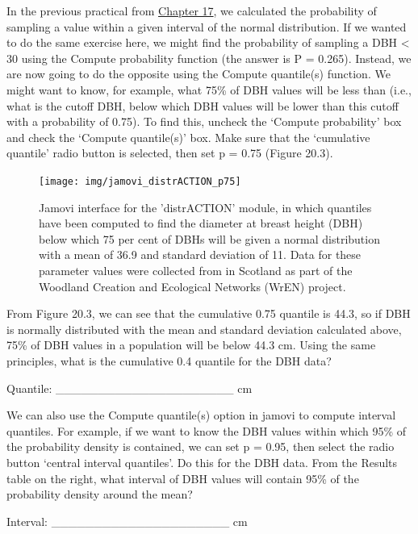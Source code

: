 \documentclass[
]{scrbook}
\begin{document}
In the previous practical from \protect\hyperlink{Chapter_17}{Chapter 17}, we calculated the probability of sampling a value within a given interval of the normal distribution.
If we wanted to do the same exercise here, we might find the probability of sampling a DBH \textless{} 30 using the Compute probability function (the answer is P = 0.265).
Instead, we are now going to do the opposite using the Compute quantile(s) function.
We might want to know, for example, what 75\% of DBH values will be less than (i.e., what is the cutoff DBH, below which DBH values will be lower than this cutoff with a probability of 0.75).
To find this, uncheck the `Compute probability' box and check the `Compute quantile(s)' box.
Make sure that the `cumulative quantile' radio button is selected, then set p = 0.75 (Figure 20.3).

\begin{figure}
\texttt{[image: img/jamovi\_distrACTION\_p75]} \caption{Jamovi interface for the 'distrACTION' module, in which quantiles have been computed to find the diameter at breast height (DBH) below which 75 per cent of DBHs will be given a normal distribution with a mean of 36.9 and standard deviation of 11. Data for these parameter values were collected from in Scotland as part of the Woodland Creation and Ecological Networks (WrEN) project.}\label{fig:unnamed-chunk-89}
\end{figure}

From Figure 20.3, we can see that the cumulative 0.75 quantile is 44.3, so if DBH is normally distributed with the mean and standard deviation calculated above, 75\% of DBH values in a population will be below 44.3 cm.
Using the same principles, what is the cumulative 0.4 quantile for the DBH data?

Quantile: \_\_\_\_\_\_\_\_\_\_\_\_\_\_\_\_\_\_\_\_\_ cm

We can also use the Compute quantile(s) option in jamovi to compute interval quantiles.
For example, if we want to know the DBH values within which 95\% of the probability density is contained, we can set p = 0.95, then select the radio button `central interval quantiles'.
Do this for the DBH data.
From the Results table on the right, what interval of DBH values will contain 95\% of the probability density around the mean?

Interval: \_\_\_\_\_\_\_\_\_\_\_\_\_\_\_\_\_\_\_\_\_ cm
\end{document}
